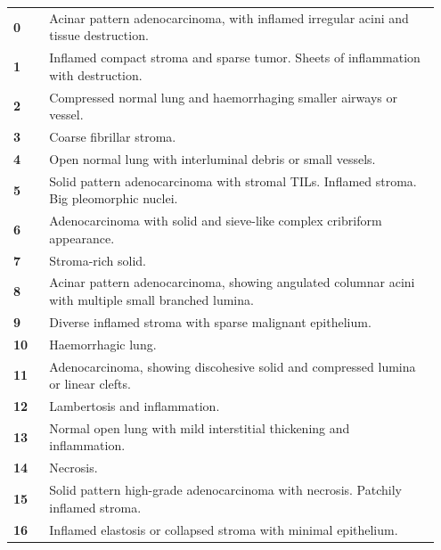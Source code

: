 \documentclass{l4proj}
\begin{document}
\begin{appendices}
\begin{longtable}{p{0.08\linewidth} p{0.87\linewidth}}
\endlastfoot
\textbf{0}  & Acinar pattern adenocarcinoma, with inflamed irregular acini and tissue destruction.                 \\
\textbf{1}  & Inflamed compact stroma and sparse tumor. Sheets of inflammation with destruction.                   \\
\textbf{2}  & Compressed normal lung and haemorrhaging smaller airways or vessel.                                  \\
\textbf{3}  & Coarse fibrillar stroma.                                                                             \\
\textbf{4}  & Open normal lung with interluminal debris or small vessels.                                          \\
\textbf{5}  & Solid pattern adenocarcinoma with stromal TILs. Inflamed stroma. Big pleomorphic nuclei.             \\
\textbf{6}  & Adenocarcinoma with solid and sieve-like complex cribriform appearance.                              \\
\textbf{7}  & Stroma-rich solid.                                                                                   \\
\textbf{8}  & Acinar pattern adenocarcinoma, showing angulated columnar acini with multiple small branched lumina. \\
\textbf{9}  & Diverse inflamed stroma with sparse malignant epithelium.                                            \\
\textbf{10} & Haemorrhagic lung.                                                                                   \\
\textbf{11} & Adenocarcinoma, showing discohesive solid and compressed lumina or linear clefts.                    \\
\textbf{12} & Lambertosis and inflammation.                                                                        \\
\textbf{13} & Normal open lung with mild interstitial thickening and inflammation.                                 \\
\textbf{14} & Necrosis.                                                                                            \\
\textbf{15} & Solid pattern high-grade adenocarcinoma with necrosis. Patchily inflamed stroma.                     \\
\textbf{16} & Inflamed elastosis or collapsed stroma with minimal epithelium.                                      \\

\end{longtable}
\end{appendices}
\end{document}
